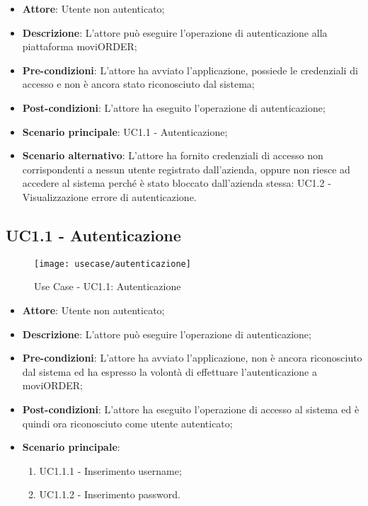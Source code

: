 \begin{itemize}
	\item \textbf{Attore}: Utente non autenticato;
	\item \textbf{Descrizione}: L'attore può eseguire l'operazione di autenticazione alla piattaforma moviORDER;
	\item \textbf{Pre-condizioni}: L'attore ha avviato l'applicazione, possiede le credenziali di accesso e non è ancora stato riconosciuto dal sistema;
	\item \textbf{Post-condizioni}: L'attore ha eseguito l'operazione di autenticazione;
	\item \textbf{Scenario principale}: UC1.1 - Autenticazione;
	\item \textbf{Scenario alternativo}: L'attore ha fornito credenziali di accesso non corrispondenti a nessun utente registrato dall'azienda, oppure non riesce ad accedere al sistema perché è stato bloccato dall'azienda stessa: UC1.2 - Visualizzazione errore di autenticazione. 
\end{itemize}

\subsection{UC1.1 - Autenticazione}

\begin{figure}[!h] 
    \centering 
    \texttt{[image: usecase/autenticazione]} 
    \caption{Use Case - UC1.1: Autenticazione}
\end{figure}

\begin{itemize}
	\item \textbf{Attore}: Utente non autenticato;
	\item \textbf{Descrizione}: L'attore può eseguire l'operazione di autenticazione;
	\item \textbf{Pre-condizioni}: L’attore ha avviato l’applicazione, non è ancora riconosciuto dal sistema ed ha espresso la volontà di eﬀettuare l’autenticazione a moviORDER;
	\item \textbf{Post-condizioni}: L’attore ha eseguito l’operazione di accesso al sistema ed è quindi ora riconosciuto come utente autenticato;
	\item \textbf{Scenario principale}: 
		\begin{enumerate}
			\item UC1.1.1 - Inserimento username;
			\item UC1.1.2 - Inserimento password.
		\end{enumerate} 
\end{itemize}

